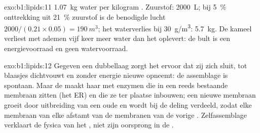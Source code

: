 \begin{solution}{exo:b1:lipids:11}
\qty{1.07}{kg} water per kilogram . Zuurstof: \qty{2000}{L}; bij
\qty{5}{\%} onttrekking uit \qty{21}{\%} zuurstof is de benodigde lucht
$2000/(0.21\times 0.05) = \qty{190}{m^3}$; het waterverlies bij
\qty{30}{g/m^3}: \qty{5.7}{kg}. De kameel verliest met ademen vijf keer meer water
dan het  oplevert: de bult is een energievoorraad en geen watervoorraad.
\end{solution}

\begin{solution}{exo:b1:lipids:12}
Gegeven een dubbellaag zorgt het  ervoor dat zij zich sluit, tot
blaasjes dichtvouwt en zonder energie nieuwe  opneemt: de assemblage is
spontaan. Maar de  maakt haar  met enzymen die in een reeds bestaande
membraan zitten (het ER) en die ze ter plaatse inbouwen; een nieuwe membraan
groeit door uitbreiding van een oude en wordt bij de deling verdeeld, zodat elke
membraan van elke  afstamt van de membranen van de vorige . Zelfassemblage
verklaart de fysica van het , niet zijn oorsprong in de .
\end{solution}

